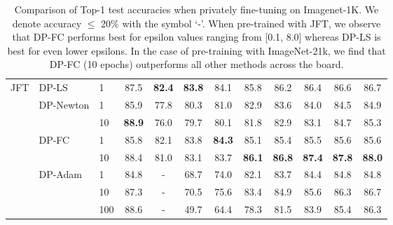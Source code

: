 \documentclass[letterpaper]{article} \usepackage{fullpage}
\begin{document}
\begin{table*}[!h]
\begin{tabular}{lllc|cccccccc}
		\multirow{8}{*}{JFT} & \multirow{ 1}{*}{DP-LS}
		                                          & 1      & 87.5          & \textbf{82.4} & \textbf{83.8} & 84.1 & 85.8 & 86.2 & 86.4 & 86.6 & 86.7 \\
		\addlinespace[0.1cm]
\addlinespace[0.1cm]
		            & \multirow{ 2}{*}{DP-Newton} & 1      & 85.9          & 77.8 & 80.3 & 81.0 & 82.9 & 83.6 & 84.0 & 84.5 & 84.9 \\
		            &                             & 10     & \textbf{88.9} & 76.0 & 79.7 & 80.1 & 81.8 & 82.9 & 83.1 & 84.7 & 85.3 \\
		\addlinespace[0.1cm]
\addlinespace[0.1cm]
		            & \multirow{ 2}{*}{DP-FC}     & 1      & 85.8          & 82.1 & 83.8 & \textbf{84.3} & 85.1 & 85.4 & 85.5 & 85.6 & 85.6 \\
		            &                             & 10     & 88.4          & 81.0 & 83.1 & 83.7 & \textbf{86.1} & \textbf{86.8} & \textbf{87.4} & \textbf{87.8} & \textbf{88.0} \\
		\addlinespace[0.1cm]
\addlinespace[0.1cm]
		            & \multirow{ 3}{*}{DP-Adam}   & 1      & 84.8          & -   & 68.7 & 74.0 & 82.1 & 83.7 & 84.4 & 84.8 & 84.8 \\
		            &                             & 10     & 87.3          & -   & 70.5 & 75.6 & 83.4 & 84.9 & 85.6 & 86.3 & 86.7 \\
		            &                             & 100    & 88.6          & -   & 49.7 & 64.4 & 78.3 & 81.5 & 83.9 & 85.4 & 86.3 \\
		\bottomrule
	\end{tabular}
	\caption{Comparison of Top-1 test accuracies when privately fine-tuning on Imagenet-1K. We denote accuracy $\leq$ 20\% with the symbol `-'. When pre-trained with JFT, we observe that DP-FC performs best for epsilon values ranging from [0.1, 8.0] whereas DP-LS is best for even lower epsilons. In the case of pre-training with ImageNet-21k, we find that DP-FC (10 epochs) outperforms all other methods across the board.}
	\label{tab:imagenet}
\end{table*}
\end{document}
